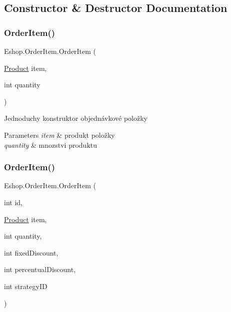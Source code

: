\subsection{Constructor \& Destructor Documentation}
\mbox{\label{class_eshop_1_1_order_item_a85aa0a0b80bfc8399f34a5cec4a4da40}} 
\subsubsection{\texorpdfstring{OrderItem()}{OrderItem()}\hspace{0.1cm}{\footnotesize\ttfamily [1/2]}}
{\footnotesize\ttfamily Eshop.\+Order\+Item.\+Order\+Item (\begin{DoxyParamCaption}\item[{\mbox{\hyperlink{class_eshop_1_1_product}{Product}}}]{item,  }\item[{int}]{quantity }\end{DoxyParamCaption})}



Jednoduchy konstruktor objednávkové položky 


\begin{DoxyParams}{Parameters}
{\em item} & produkt položky\\
\hline
{\em quantity} & mnozstvi produktu\\
\hline
\end{DoxyParams}
\mbox{\label{class_eshop_1_1_order_item_ac9751e73e7b9d2864869eee19a0fa5ba}} 
\subsubsection{\texorpdfstring{OrderItem()}{OrderItem()}\hspace{0.1cm}{\footnotesize\ttfamily [2/2]}}
{\footnotesize\ttfamily Eshop.\+Order\+Item.\+Order\+Item (\begin{DoxyParamCaption}\item[{int}]{id,  }\item[{\mbox{\hyperlink{class_eshop_1_1_product}{Product}}}]{item,  }\item[{int}]{quantity,  }\item[{int}]{fixed\+Discount,  }\item[{int}]{percentual\+Discount,  }\item[{int}]{strategy\+ID }\end{DoxyParamCaption})}



